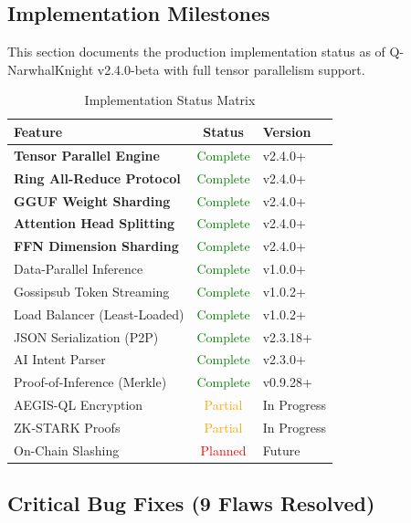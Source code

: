 \documentclass[11pt,a4paper]{article}
\begin{document}
\subsection{Implementation Milestones}

This section documents the production implementation status as of Q-NarwhalKnight v2.4.0-beta with full tensor parallelism support.

\begin{table}[H]
\centering
\caption{Implementation Status Matrix}
\begin{tabular}{|l|c|l|}
\hline
\textbf{Feature} & \textbf{Status} & \textbf{Version} \\
\hline
\textbf{Tensor Parallel Engine} & \textcolor{green}{Complete} & v2.4.0+ \\
\textbf{Ring All-Reduce Protocol} & \textcolor{green}{Complete} & v2.4.0+ \\
\textbf{GGUF Weight Sharding} & \textcolor{green}{Complete} & v2.4.0+ \\
\textbf{Attention Head Splitting} & \textcolor{green}{Complete} & v2.4.0+ \\
\textbf{FFN Dimension Sharding} & \textcolor{green}{Complete} & v2.4.0+ \\
Data-Parallel Inference & \textcolor{green}{Complete} & v1.0.0+ \\
Gossipsub Token Streaming & \textcolor{green}{Complete} & v1.0.2+ \\
Load Balancer (Least-Loaded) & \textcolor{green}{Complete} & v1.0.2+ \\
JSON Serialization (P2P) & \textcolor{green}{Complete} & v2.3.18+ \\
AI Intent Parser & \textcolor{green}{Complete} & v2.3.0+ \\
Proof-of-Inference (Merkle) & \textcolor{green}{Complete} & v0.9.28+ \\
AEGIS-QL Encryption & \textcolor{orange}{Partial} & In Progress \\
ZK-STARK Proofs & \textcolor{orange}{Partial} & In Progress \\
On-Chain Slashing & \textcolor{red}{Planned} & Future \\
\hline
\end{tabular}
\end{table}

\subsection{Critical Bug Fixes (9 Flaws Resolved)}
\end{document}
